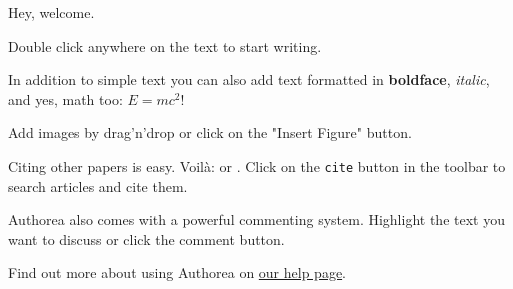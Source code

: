 Hey, welcome. 

Double click anywhere on the text to start writing. 

In addition to simple text you can also add text formatted in \textbf{boldface}, \textit{italic}, and yes, math too: $E  =  mc^{2}$! 

Add images by drag'n'drop or click on the "Insert Figure" button. 

Citing other papers is easy. Voilà: \cite{2012} or \cite{Holstein_2009}. Click on the \verb|cite| button in the toolbar to search articles and cite them. 

Authorea also comes with a powerful commenting system. Highlight the text you want to discuss or click the comment button. 

Find out more about using Authorea on \href{https://www.authorea.com/help}{our help page}.
  
  
  